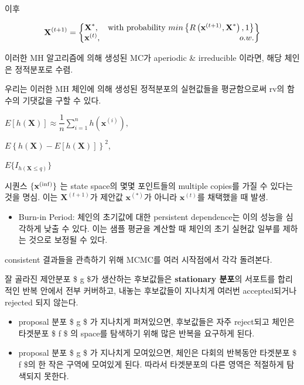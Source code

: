\documentclass[
]{book}
\providecommand{\tightlist}{%
  \setlength{\itemsep}{0pt}\setlength{\parskip}{0pt}}
\begin{document}
이후

\[
\textbf {X}^{(t+1)} = \left\{\begin{array}{@{}lr@{}}
    \textbf {X}^{\ast}, & \text{with probability } min \left\{ R \left( \textbf {x}^{(t+1)}, \textbf {X}^{\ast} \right), 1 \right\} \\
    \textbf {x}^{(t)}, & o.w.
    \end{array}\right\}
\]

이러한 MH 알고리즘에 의해 생성된 MC가 aperiodic \& irreducible 이라면, 해당 체인은 정적분포로 수렴.

우리는 이러한 MH 체인에 의해 생성된 정적분포의 실현값들을 평균함으로써 rv의 함수의 기댓값을 구할 수 있다.

\(E \left[ h \left( \textbf {X} \right) \right] \approx \dfrac {1} {n} \sum_{i=1}^n {h \left( \textbf {x}^{(i)} \right)},\)

\(E { \left\{ h \left( \textbf {X} \right) - E \left[ h \left( \textbf {X} \right) \right] \right\} }^2\),

\(E \{ I_{h ( \textbf {X} \le q )} \}\)

시퀀스 \(\{ \textbf x^{(\inf)} \}\) 는 state space의 몇몇 포인트들의 multiple copies를 가질 수 있다는 것을 명심. 이는 \(\textbf {X}^{(t+1)}\)가 제안값 \(\textbf {x}^{(\ast )}\)가 아니라 \(\textbf {x}^{(t)}\)를 채택했을 때 발생.

\begin{itemize}
\tightlist
\item
  Burn-in Period: 체인의 초기값에 대한 persistent dependence는 이의 성능을 심각하게 낮출 수 있다. 이는 샘플 평균을 계산할 때 체인의 초기 실현값 일부를 제하는 것으로 보정될 수 있다.
\end{itemize}

consistent 결과들을 관측하기 위해 MCMC를 여러 시작점에서 각각 돌려본다.

잘 골라진 제안분포 \$ g \$가 생산하는 후보값들은 \textbf{stationary 분포}의 서포트를 합리적인 반복 안에서 전부 커버하고, 내놓는 후보값들이 지나치게 여러번 accepted되거나 rejected 되지 않는다.

\begin{itemize}
\tightlist
\item
  proposal 분포 \$ g \$ 가 지나치게 퍼져있으면, 후보값들은 자주 reject되고 체인은 타겟분포 \$ f \$ 의 space를 탐색하기 위해 많은 반복을 요구하게 된다.
\item
  proposal 분포 \$ g \$ 가 지나치게 모여있으면, 체인은 다회의 반복동안 타겟분포 \$ f \$의 한 작은 구역에 모여있게 된다. 따라서 타겟분포의 다른 영역은 적절하게 탐색되지 못한다.
\end{itemize}
\end{document}
